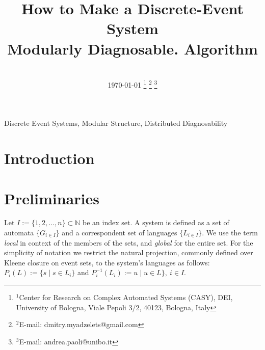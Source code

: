 \documentclass[a4paper, 10pt, conference]{ieeeconf}
\begin{document}
\title{How to Make a Discrete-Event System \\ Modularly Diagnosable.
Algorithm} 
\author{
	\\ \today
	\thanks{$^{1}$Center for Research on Complex Automated Systems (CASY), DEI,
	University of Bologna, Viale Pepoli 3/2, 40123, Bologna, Italy}
		\thanks{$^{2}$E-mail: {dmitry.myadzelets@gmail.com}}
		\thanks{$^{3}$E-mail: {andrea.paoli@unibo.it}}
}
\maketitle


\begin{abstract}

\end{abstract}

\begin{keywords}
Discrete Event Systems, Modular Structure, Distributed Diagnosability
\end{keywords}

\newtheorem{theorem}{Theorem}
\newtheorem{definition}{Definition}
\newtheorem{lemma}{Lemma}
\newtheorem{assumption}{Assumption}
\newtheorem{corollary}{Corollary}
\newtheorem{example}{Example}


\section{Introduction}


\section{Preliminaries}
\label{sec:Preliminaries}
Let $I := \{1,2,\ldots,n\} \subset  \mathbb{N}$ be an index set. A system is
defined as a set of automata $\{G_{i \in I}\}$ and a correspondent set
of languages $\{L_{i \in I}\}$. We use the term \emph{local} in context
of the members of the sets, and \emph{global} for the entire set.
For the simplicity of notation we restrict the natural projection, commonly
defined over Kleene closure on event sets, to the system's languages as
follows: $P_i(L) := \{s\mid s\in L_{i}\}$ and $P_i^{-1}(L_{i}) := u \mid u
\in L\}, ~i \in I$.
\end{document}
